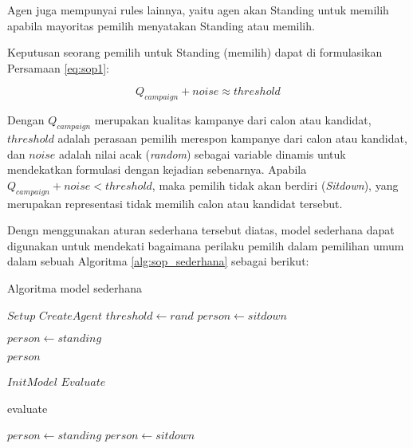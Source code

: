 Agen juga mempunyai rules lainnya, yaitu agen akan Standing untuk memilih apabila mayoritas pemilih menyatakan Standing atau memilih.

Keputusan seorang pemilih untuk Standing (memilih) dapat di formulasikan Persamaan \ref{eq:sop1}:

\begin{equation}
Q_{campaign} + noise \approx threshold
\label{eq:sop1}
\end{equation}

Dengan $Q_{campaign}$ merupakan kualitas kampanye dari calon atau kandidat, $threshold$ adalah perasaan pemilih merespon kampanye dari calon atau kandidat, dan $noise$ adalah nilai acak (\textit{random}) sebagai variable dinamis untuk mendekatkan formulasi dengan kejadian sebenarnya. Apabila $Q_{campaign} + noise < threshold$, maka pemilih tidak akan berdiri (\textit{Sitdown}), yang merupakan representasi tidak memilih calon atau kandidat tersebut.

Dengn menggunakan aturan sederhana tersebut diatas, model sederhana dapat digunakan untuk mendekati bagaimana perilaku pemilih dalam pemilihan umum dalam sebuah Algoritma \ref{alg:sop_sederhana} sebagai berikut:

\begin{algorithm}
\caption{Algoritma model sederhana}\label{alg:sop_sederhana}
	\begin{algorithmic}[1]
		\State $Setup$
		\State $CreateAgent$
		\State $threshold \longleftarrow rand$ 
		\State $person \longleftarrow sitdown$ 
	\EndProcedure

			\State $person \longleftarrow standing$ 
		\EndIf

		\Return $person$
	\EndProcedure

		\Require $InitModel$
		\Require $Evaluate$

			\State evaluate

				\State $person \longleftarrow standing$
			\Else
				\State $person \longleftarrow sitdown$
			\EndIf
		\EndFor\label{simplemodelforloop}
	\EndProcedure
	\end{algorithmic}
\end{algorithm}

